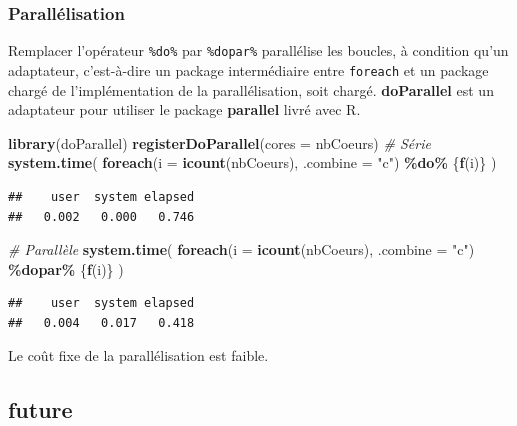 \documentclass[
  12pt,
  french,
  a4paper,
  extrafontsizes,onecolumn,openright
  ]{memoir}
\newenvironment{Shaded}{\begin{snugshade}}{\end{snugshade}}
\newcommand{\AttributeTok}[1]{\textcolor[rgb]{0.13,0.29,0.53}{#1}}
\newcommand{\CommentTok}[1]{\textcolor[rgb]{0.56,0.35,0.01}{\textit{#1}}}
\newcommand{\FunctionTok}[1]{\textcolor[rgb]{0.13,0.29,0.53}{\textbf{#1}}}
\newcommand{\NormalTok}[1]{#1}
\newcommand{\SpecialCharTok}[1]{\textcolor[rgb]{0.81,0.36,0.00}{\textbf{#1}}}
\newcommand{\StringTok}[1]{\textcolor[rgb]{0.31,0.60,0.02}{#1}}
\begin{document}
\subsubsection{Parallélisation}\label{paralluxe9lisation}

Remplacer l'opérateur \texttt{\%do\%} par \texttt{\%dopar\%} parallélise les boucles, à condition qu'un adaptateur, c'est-à-dire un package intermédiaire entre \texttt{foreach} et un package chargé de l'implémentation de la parallélisation, soit chargé.
\textbf{doParallel} est un adaptateur pour utiliser le package \textbf{parallel} livré avec R.

\scriptsize

\begin{Shaded}
\begin{Highlighting}[]
\FunctionTok{library}\NormalTok{(doParallel)}
\FunctionTok{registerDoParallel}\NormalTok{(}\AttributeTok{cores =}\NormalTok{ nbCoeurs)}
\CommentTok{\# Série}
\FunctionTok{system.time}\NormalTok{(}
  \FunctionTok{foreach}\NormalTok{(}\AttributeTok{i =} \FunctionTok{icount}\NormalTok{(nbCoeurs), }\AttributeTok{.combine =} \StringTok{"c"}\NormalTok{) }\SpecialCharTok{\%do\%}\NormalTok{ \{}\FunctionTok{f}\NormalTok{(i)\}}
\NormalTok{)}
\end{Highlighting}
\end{Shaded}

\begin{verbatim}
##    user  system elapsed 
##   0.002   0.000   0.746
\end{verbatim}

\begin{Shaded}
\begin{Highlighting}[]
\CommentTok{\# Parallèle}
\FunctionTok{system.time}\NormalTok{(}
  \FunctionTok{foreach}\NormalTok{(}\AttributeTok{i =} \FunctionTok{icount}\NormalTok{(nbCoeurs), }\AttributeTok{.combine =} \StringTok{"c"}\NormalTok{) }\SpecialCharTok{\%dopar\%}\NormalTok{ \{}\FunctionTok{f}\NormalTok{(i)\}}
\NormalTok{)}
\end{Highlighting}
\end{Shaded}

\begin{verbatim}
##    user  system elapsed 
##   0.004   0.017   0.418
\end{verbatim}

\normalsize

Le coût fixe de la parallélisation est faible.

\subsection{future}\label{future}
\end{document}
